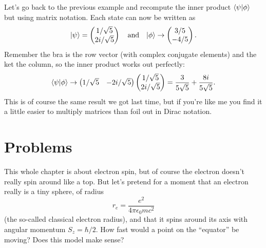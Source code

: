 \begin{example}
Let's go back to the previous example and recompute the inner product $\langle \psi | \phi \rangle$ but using matrix notation.  Each state can now be written as 
\[
| \psi \rangle = \begin{pmatrix} 1/\sqrt{5} \\ 2i/\sqrt{5} \end{pmatrix} \quad \text{and} \quad | \phi \rangle \to \begin{pmatrix} 3/5 \\ -4/5 \end{pmatrix}.
\]
Remember the bra is the row vector (with complex conjugate elements) and the ket the column, so the inner product works out perfectly:
\[
\langle \psi | \phi \rangle \to \begin{pmatrix} 1/\sqrt{5} & -2i/\sqrt{5} \end{pmatrix} \begin{pmatrix} 1/\sqrt{5} \\ 2i/\sqrt{5} \end{pmatrix} = \frac{3}{5\sqrt{5}} + \frac{8i}{5\sqrt{5}}.
\]
This is of course the same result we got last time, but if you're like me you find it a little easier to multiply matrices than foil out in Dirac notation.  

\end{example}

\section*{Problems}
%

\begin{problem}
This whole chapter is about electron spin, but of course the electron doesn't really spin around like a top.  But let's pretend for a moment that an electron really is a tiny sphere, of radius
\[
r_e = \frac{e^2}{4\pi \epsilon_0 mc^2}
\]
(the so-called classical electron radius), and that it spins around its axis with angular momentum $S_z = \hbar/2$.  How fast would a point on the ``equator'' be moving?  Does this model make sense? 
\end{problem}

